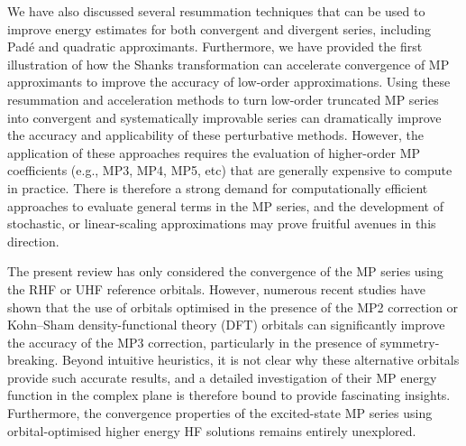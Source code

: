 \documentclass[aps,prb,reprint,noshowkeys,superscriptaddress]{revtex4-1}
\newcommand{\latin}[1]{#1}
\newcommand{\eg}{\latin{e.g.}}
\begin{document}
We have also discussed several resummation techniques that can be used to improve energy estimates
for both convergent and divergent series, including Pad\'e and quadratic approximants.
Furthermore, we have provided the first illustration of how the Shanks transformation can accelerate
convergence of MP approximants to improve the accuracy of low-order approximations.
Using these resummation and acceleration methods to turn low-order truncated MP series into convergent and
systematically improvable series can dramatically improve the accuracy and applicability of these perturbative methods.
However, the application of these approaches requires the evaluation of higher-order MP coefficients 
(\eg, MP3, MP4, MP5, etc) that are generally expensive to compute in practice.
There is therefore a strong demand for computationally efficient approaches to evaluate general terms in the MP 
series, and the development of stochastic,\cite{Thom_2007,Neuhauser_2012,Willow_2012,Takeshita_2017,Li_2019}
or linear-scaling approximations\cite{Rauhut_1998,Schutz_1999}
may prove fruitful avenues in this direction.

The present review has only considered the convergence of the MP series using the RHF or UHF 
reference orbitals.
However, numerous recent studies have shown that the use of orbitals optimised in the presence of the MP2 
correction\cite{Bozkaya_2011,Neese_2009,Lee_2018} or Kohn--Sham density-functional theory (DFT) orbitals 
can significantly improve the accuracy of the MP3 correction,\cite{Bertels_2019,Rettig_2020}
particularly in the presence of symmetry-breaking.
Beyond intuitive heuristics, it is not clear why these alternative orbitals provide such accurate results, 
and a detailed investigation of their MP energy function in the complex plane is therefore bound to provide
fascinating insights.
Furthermore, the convergence properties of the excited-state MP series using orbital-optimised higher energy 
HF solutions\cite{Gilbert_2008,Barca_2014,Barca_2018a,Barca_2018b} remains entirely unexplored.\cite{Lee_2019,CarterFenk_2020}
\end{document}
